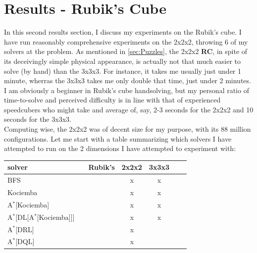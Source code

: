 
\chapter{Results - Rubik's Cube} %

\label{sec:ResRubiks} %


In this second results section, I discuss my experiments on the Rubik's cube. I have run reasonably comprehensive experiments on the 2x2x2, throwing 6 of my solvers at the problem. As mentioned in \ref{sec:Puzzles}, the 2x2x2 \textbf{RC}, in spite of its deceivingly simple physical appearance, is actually not that much easier to solve (by hand) than the 3x3x3. For instance, it takes me usually just under 1 minute, wherras the 3x3x3 takes me only double that time, just under 2 minutes. I am obviously a beginner in Rubik's cube handsolving, but my personal ratio of time-to-solve and perceived difficulty is in line with that of experienced speedcubers who might take and average of, say, 2-3 seconds for the 2x2x2 and 10 seconds for the 3x3x3.
\\
Computing wise, the 2x2x2 was of decent size for my purpose, with its 88 million configurations. Let me start with a table summarizing which solvers I have attempted to run on the 2 dimensions I have attempted to experiment with:

\begin{center}
\begin{tabular}{l*{5}{c}r}
\hline
\textbf{solver}      & & \textbf{Rubik's} & \textbf{2x2x2} & \textbf{3x3x3} \\
\hline
BFS   &   &        &  x  &  x  \\
\hline
Kociemba   &   &      &  x  &  x  \\
\hline
A$^{*}$[Kociemba]  &   &  &  x  &  x  \\
\hline
A$^{*}$[DL[A$^{*}$[Kociemba]]]  &   &  &  x  &  x  \\
\hline
A$^{*}$[DRL]  &   &  &  x  &  \\
\hline
A$^{*}$[DQL]  &   &  &  x  &  \\
\hline
\end{tabular}
\end{center}









